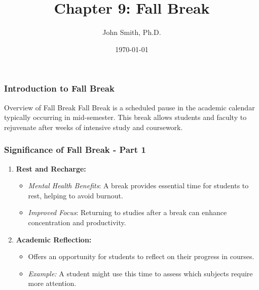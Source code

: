 \documentclass[aspectratio=169]{beamer}
\title[Fall Break]{Chapter 9: Fall Break}
\author[J. Smith]{John Smith, Ph.D.}
\institute[University Name]{
  Department of Education\\
  University Name\\
  \vspace{0.3cm}
  Email: email@university.edu\\
  Website: www.university.edu
}
\date{\today}
\begin{document}
\frame{\titlepage}

\begin{frame}[fragile]
    \frametitle{Introduction to Fall Break}
    \begin{block}{Overview of Fall Break}
        Fall Break is a scheduled pause in the academic calendar typically occurring in mid-semester. This break allows students and faculty to rejuvenate after weeks of intensive study and coursework.
    \end{block}
\end{frame}

\begin{frame}[fragile]
    \frametitle{Significance of Fall Break - Part 1}
    \begin{enumerate}
        \item \textbf{Rest and Recharge:}
        \begin{itemize}
            \item \textit{Mental Health Benefits}: A break provides essential time for students to rest, helping to avoid burnout.
            \item \textit{Improved Focus}: Returning to studies after a break can enhance concentration and productivity.
        \end{itemize}

        \item \textbf{Academic Reflection:}
        \begin{itemize}
            \item Offers an opportunity for students to reflect on their progress in courses.
            \item \textit{Example:} A student might use this time to assess which subjects require more attention.
        \end{itemize}
    \end{enumerate}
\end{frame}
\end{document}
